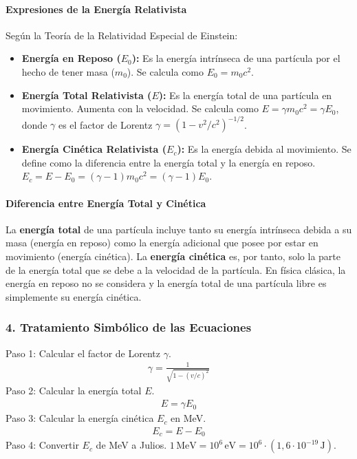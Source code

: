 \paragraph*{Expresiones de la Energía Relativista}
Según la Teoría de la Relatividad Especial de Einstein:
\begin{itemize}
    \item \textbf{Energía en Reposo ($E_0$):} Es la energía intrínseca de una partícula por el hecho de tener masa ($m_0$). Se calcula como $E_0 = m_0 c^2$.
    \item \textbf{Energía Total Relativista ($E$):} Es la energía total de una partícula en movimiento. Aumenta con la velocidad. Se calcula como $E = \gamma m_0 c^2 = \gamma E_0$, donde $\gamma$ es el factor de Lorentz $\gamma = (1-v^2/c^2)^{-1/2}$.
    \item \textbf{Energía Cinética Relativista ($E_c$):} Es la energía debida al movimiento. Se define como la diferencia entre la energía total y la energía en reposo. $E_c = E - E_0 = (\gamma - 1)m_0 c^2 = (\gamma - 1)E_0$.
\end{itemize}
\paragraph*{Diferencia entre Energía Total y Cinética}
La \textbf{energía total} de una partícula incluye tanto su energía intrínseca debida a su masa (energía en reposo) como la energía adicional que posee por estar en movimiento (energía cinética). La \textbf{energía cinética} es, por tanto, solo la parte de la energía total que se debe a la velocidad de la partícula. En física clásica, la energía en reposo no se considera y la energía total de una partícula libre es simplemente su energía cinética.

\subsubsection*{4. Tratamiento Simbólico de las Ecuaciones}
Paso 1: Calcular el factor de Lorentz $\gamma$.
\begin{gather}
    \gamma = \frac{1}{\sqrt{1 - (v/c)^2}}
\end{gather}
Paso 2: Calcular la energía total $E$.
\begin{gather}
    E = \gamma E_0
\end{gather}
Paso 3: Calcular la energía cinética $E_c$ en MeV.
\begin{gather}
    E_c = E - E_0
\end{gather}
Paso 4: Convertir $E_c$ de MeV a Julios.
$1 \, \text{MeV} = 10^6 \, \text{eV} = 10^6 \cdot (1,6 \cdot 10^{-19} \, \text{J})$.


